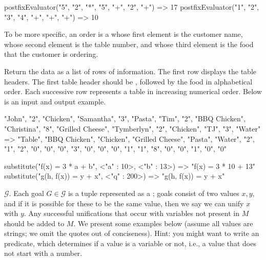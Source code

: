 \begin{verbnobox}[\small]
postfixEvaluator({"5", "2", "*", "5", "+", "2", "+"}) => 17
postfixEvaluator({"1", "2", "3", "4", "+", "+", "+"}) => 10
\end{verbnobox}


To be more specific, an order is a  whose first element is the customer name, whose second element is the table number, and whose third element is the food that the customer is ordering. 

Return the data as a list of rows of information. The first row displays the table headers. The first table header should be , followed by the food in alphabetical order. Each successive row represents a table in increasing numerical order. Below is an input and output example.

\begin{verbnobox}[\small]
{{"John", "2", "Chicken"}, {"Samantha", "3", "Pasta"}, 
 {"Tim", "2", "BBQ Chicken"}, {"Christina", "8", "Grilled Cheese"}, 
 {"Tymberlyn", "2", "Chicken"}, {"TJ", "3", "Water"}}
=> 
{{"Table", "BBQ Chicken", "Chicken", "Grilled Cheese", "Pasta", "Water"},
 {"2", "1", "2", "0", "0", "0"},
 {"3", "0", "0", "0", "1", "1"},
 {"8", "0", "0", "1", "0", "0"}}
\end{verbnobox}


\begin{verbnobox}[\small]
substitute("f(x) = 3 * a + b", {<"a" : 10>, <"b" : 13>})
           => "f(x) = 3 * 10 + 13"
substitute("g(h, f(x)) = y + x", {<"q" : 200>})          
           => "g(h, f(x)) = y + x" 
\end{verbnobox}

 $\mathcal{G}$. Each goal $G \in \mathcal{G}$ is a tuple represented as a ; goals consist of two values $x, y$, and if it is possible for these to be the same value, then we say we can unify $x$ with $y$. Any successful unifications that occur with variables not present in $M$ should be added to $M$. We present some examples below (assume all values are strings; we omit the quotes out of conciseness). Hint: you might want to write an  predicate, which determines if a value is a variable or not, i.e., a value that does not start with a number.

